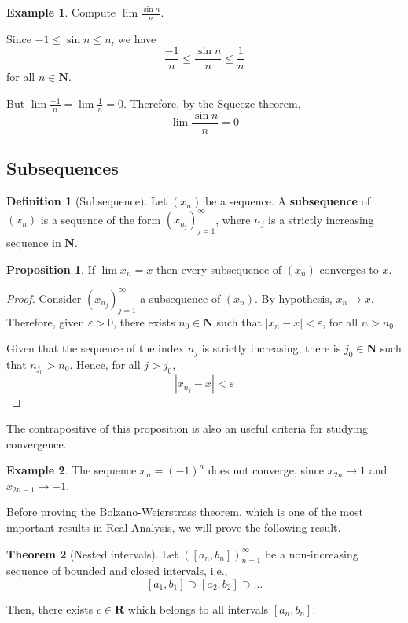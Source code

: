 \documentclass[12pt,a4paper]{article}
\theoremstyle{definition}
\newtheorem{theorem}{Theorem}[section]
\newtheorem{proposition}[theorem]{Proposition}
\newtheorem{example}{Example}[section]
\newtheorem{definition}{Definition}[section]
\begin{document}
\begin{example}
	Compute $\lim \frac{\sin n}{n}$.
	
	Since $-1 \leq \sin n \leq n$, we have \[ \frac{-1}{n} \leq \frac{\sin n}{n} \leq \frac{1}{n} \] for all $n \in \textbf{N}$.
	
	But $\lim \frac{-1}{n} = \lim \frac{1}{n} = 0$. Therefore, by the Squeeze theorem, \[ \lim \frac{\sin n}{n} = 0 \]
\end{example}

\subsection{Subsequences}

\begin{definition}[Subsequence]
	Let $(x_n)$ be a sequence. A \textbf{subsequence} of $(x_n)$ is a sequence of the form $(x_{n_j})_{j=1}^\infty$, where $n_j$ is a strictly increasing sequence in $\textbf{N}$. 
\end{definition}

\begin{proposition}
	If $\lim x_n = x$ then every subsequence of $(x_n)$ converges to $x$.
\end{proposition}

\begin{proof}
	Consider $(x_{n_j})_{j=1}^\infty$ a subsequence of $(x_n)$. By hypothesis, $x_n \longrightarrow x$. Therefore, given $\varepsilon > 0$, there exists $n_0 \in \textbf{N}$ such that $|x_n - x| < \varepsilon$, for all $n > n_0$.
	
	Given that the sequence of the index $n_j$ is strictly increasing, there is $j_0 \in \textbf{N}$ such that $n_{j_0} > n_0$. Hence, for all $j > j_0$, \[ | x_{n_j} - x | < \varepsilon \]
\end{proof}

The contrapositive of this proposition is also an useful criteria for studying convergence.

\begin{example}
	The sequence $x_n = (-1)^n$ does not converge, since $x_{2n} \longrightarrow 1$ and $x_{2n-1} \longrightarrow -1$.
\end{example}

Before proving the Bolzano-Weierstrass theorem, which is one of the most important results in Real Analysis, we will prove the following result.

\begin{theorem}[Nested intervals]\label{nested-intervals}
	Let $([a_n, b_n])_{n=1}^\infty$ be a non-increasing sequence of bounded and closed intervals, i.e., \[ [a_1, b_1] \supset [a_2, b_2] \supset \ldots \]
	
	Then, there exists $c \in \textbf{R}$ which belongs to all intervals $[a_n, b_n]$.
\end{theorem}
\end{document}
